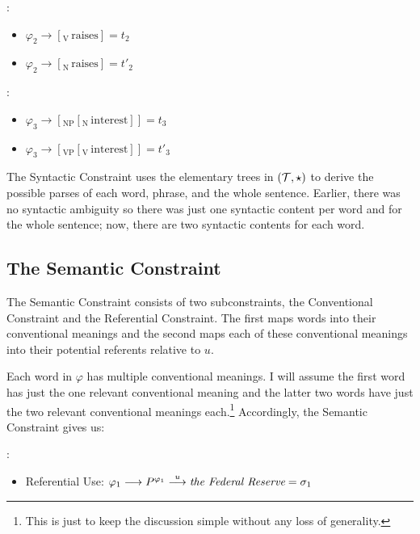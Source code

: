 \ea {}:\\
\begin{itemize}
\item $\varphi_2 \longrightarrow [_{\mathrm{V}}\,\mathrm{raises}] = t_2$ 
\item $\varphi_2 \longrightarrow [_{\mathrm{N}}\,\mathrm{raises}] = t'_2$
\end{itemize}
\z


\ea {}:\\
\begin{itemize}
\item $\varphi_3 \longrightarrow [_{\mathrm{NP}}[_{\mathrm{N}}\,\mathrm{interest}]] = t_3$ 
\item $\varphi_3 \longrightarrow [_{\mathrm{VP}}[_{\mathrm{V}}\,\mathrm{interest}]] = t'_3$
\end{itemize}
\z

The Syntactic Constraint uses the elementary trees in $({\cal T}, \star)$ to derive the possible parses of each word, phrase, and the whole sentence. Earlier, there was no syntactic ambiguity so there was just one syntactic content per word and for the whole sentence; now, there are two syntactic contents for each word.


\subsection{The Semantic Constraint}

The Semantic Constraint consists of two subconstraints, the Conventional Constraint and the Referential Constraint. The first maps words into their conventional meanings and the second maps each of these conventional meanings into their potential referents relative to $u$.

Each word in $\varphi$ has multiple conventional meanings. I will assume the first word  has just the one relevant conventional meaning and the latter two words have just the two relevant conventional meanings each.\footnote{This is just to keep the discussion simple without any loss of generality.} Accordingly, the Semantic Constraint gives us:

\ea {}:\\
\begin{itemize}
\item Referential Use: $\varphi_1 \longrightarrow P^{\varphi_1} \stackrel{u}\longrightarrow \emph{the Federal Reserve} = \sigma_1$  
\end{itemize}
\z

